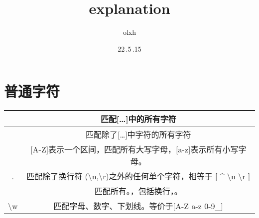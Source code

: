 \documentclass[11pt,twoside,a4paper]{article}
\begin{document}
    \title{explanation}
    \author{olxh}
    \date{22\,.5\,.15}
    

    \maketitle


    \section{普通字符}
    

    \begin{tabular}{|c|c|}
        \hline
        [ABC] & 匹配[\ldots]中的所有字符\\
        \hline
        [ \^{} ABC ] & 匹配除了[\ldots]中字符的所有字符\\
        \hline
        [A-Z] & [A-Z]表示一个区间，匹配所有大写字母，[a-z]表示所有小写字母。\\
        \hline
        . & 匹配除了换行符 (\textbackslash n,\textbackslash r)之外的任何单个字符，相等于 [ \^{} \textbackslash n \textbackslash r ] \\
        \hline
        [\textbackslash s\textbackslash S] & 匹配所有。，包括换行，。\\
        \hline
        \textbackslash w & 匹配字母、数字、下划线。等价于[A-Z a-z 0-9\_]\\
    \end{tabular}
        
        
    
\end{document}
